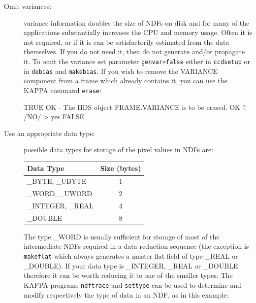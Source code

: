 \documentclass[twoside,11pt]{starlink}
\begin{document}
\begin{description}

  \item[Omit variances:] variance information doubles the size of NDFs on
   disk and for many of the applications substantially increases the CPU and
   memory usage.
   Often it is not required, or if it is can be satisfactorily estimated
   from the data themselves.
   If you do not need it, then do not generate and/or propagate it.
   To omit the variance set parameter \texttt{genvar=false} either in
   \texttt{ccdsetup} or in \texttt{debias} and \texttt{makebias}.
   If you wish to remove the VARIANCE component from a frame which
   already contains it, you can use the KAPPA command \texttt{erase}:

\begin{small}
\begin{terminalv}
TRUE
OK - The HDS object FRAME.VARIANCE is to be erased. OK ? /NO/ > yes
FALSE
\end{terminalv}
\end{small}

  \item[Use an appropriate data type:] possible data types for storage of
   the pixel values in NDFs are:

  \begin{center}
  \begin{tabular}{lc}
   Data Type         & Size (bytes) \\ \hline
   \_BYTE, \_UBYTE   & 1 \\
   \_WORD, \_UWORD   & 2 \\
   \_INTEGER, \_REAL & 4 \\
   \_DOUBLE          & 8 \\
  \end{tabular}
  \end{center}

   The type \_WORD is usually sufficient for storage of most
   of the intermediate NDFs required in a data reduction sequence
   (the exception is \texttt{makeflat} which always generates a master flat
   field of type \_REAL or \_DOUBLE).
   If your data type is \_INTEGER, \_REAL or \_DOUBLE therefore
   it can be worth reducing it to one of the smaller types.
   The KAPPA programs \texttt{ndftrace} and \texttt{settype} can be used to
   determine and modify respectively the type of data in an NDF, as in this
   example:


\end{description}
\end{document}
